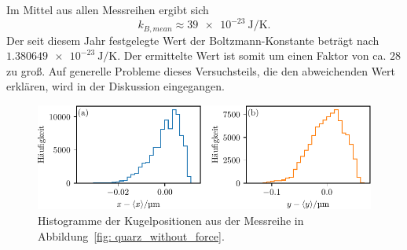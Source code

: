 Im Mittel aus allen Messreihen ergibt sich
\begin{equation}
  k_{B, mean} \approx \SI{39e-23}{\joule\per\kelvin}.
\end{equation}
Der seit diesem Jahr festgelegte Wert der Boltzmann-Konstante beträgt nach~\cite{k_b}\\ $\SI{1.380649e-23}{\joule\per\kelvin}$.
Der ermittelte Wert ist somit um einen Faktor von ca. $\num{28}$ zu groß. Auf generelle Probleme dieses Versuchsteils, die
den abweichenden Wert erklären, wird in der Diskussion eingegangen.
\begin{figure}
  \centering
  \includegraphics[scale = 1 ]{../analysis/data/i_quarz/70mA/results/without_force_histogram_70mA.pdf}
  \caption{Histogramme der Kugelpositionen aus der Messreihe in Abbildung~\ref{fig: quarz_without_force}.}
  \label{fig: quarz_without_force_hist}
\end{figure}

